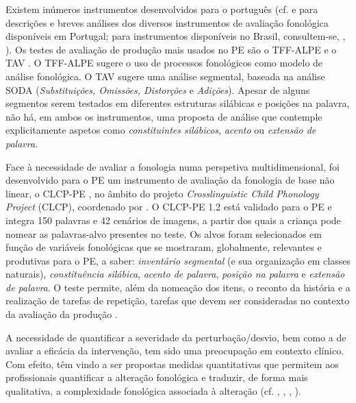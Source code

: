 \documentclass[output=paper,colorlinks,citecolor=brown,booklanguage=portuguese]{langscibook}
\begin{document}
Existem inúmeros instrumentos desenvolvidos para o português (cf. \citealp{Viana2017} e \citealp{Ramalho2017} para descrições e breves análises dos diversos instrumentos de avaliação fonológica disponíveis em Portugal; para instrumentos disponíveis no Brasil, consultem-se, , ). Os testes de avaliação de produção mais usados no PE são o TFF-ALPE \citealp{Mendes2013a} e o TAV \citep{Guimaraes2014}. O TFF-ALPE sugere o uso de processos fonológicos como modelo de análise fonológica. O TAV sugere uma análise segmental, baseada na análise SODA (\emph{Substituições, Omissões, Distorções} e \emph{Adições}). Apesar de alguns segmentos serem testados em diferentes estruturas silábicas e posições na palavra, não há, em ambos os instrumentos, uma proposta de análise que contemple explicitamente aspetos como \emph{constituintes silábicos}, \emph{acento} ou \emph{extensão de palavra}.

Face à necessidade de avaliar a fonologia numa perspetiva multidimensional, foi desenvolvido para o PE um instrumento de avaliação da fonologia de base não linear, o CLCP-PE \citep{Ramalho2014, Ramalho2017}, no âmbito do projeto \emph{Crosslinguistic Child Phonology Project} (CLCP), coordenado por \citet{Bernhardt2000}. O CLCP-PE 1.2 está validado para o PE e integra 150 palavras e 42 cenários de imagens, a partir dos quais a criança pode nomear as palavras-alvo presentes no teste. Os alvos foram selecionados em função de variáveis fonológicas que se mostraram, globalmente, relevantes e produtivas para o PE, a saber: \emph{inventário segmental} (e sua organização em classes naturais), \emph{constituência silábica}, \emph{acento de palavra}, \emph{posição na palavra} e \emph{extensão de palavra}. O teste permite, além da nomeação dos itens, o reconto da história e a realização de tarefas de repetição, tarefas que devem ser consideradas no contexto da avaliação da produção \citep{Lousada2017a, Bates2017}.

A necessidade de quantificar a severidade da perturbação/desvio, bem como a de avaliar a eficácia da intervenção, tem sido uma preocupação em contexto clínico. Com efeito, têm vindo a ser propostas medidas quantitativas que permitem aos profissionais quantificar a alteração fonológica e traduzir, de forma mais qualitativa, a complexidade fonológica associada à alteração (cf. , , , ).
\end{document}
